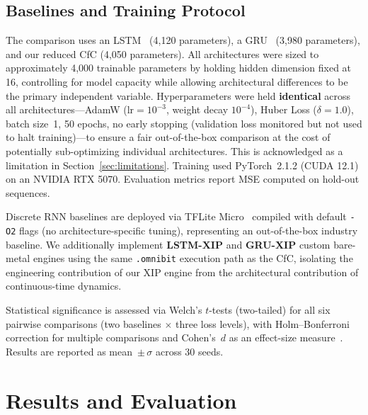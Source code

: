 \documentclass[conference]{IEEEtran}
\begin{document}
\subsection{Baselines and Training Protocol}
The comparison uses an LSTM~\cite{hochreiter1997lstm} (4,120 parameters), a
GRU~\cite{cho2014gru} (3,980 parameters), and our reduced CfC (4,050
parameters). All architectures were sized to approximately 4,000 trainable
parameters by holding hidden dimension fixed at 16, controlling for model
capacity while allowing architectural differences to be the primary
independent variable.
Hyperparameters were held \textbf{identical} across all architectures---AdamW
($\text{lr}=10^{-3}$, weight decay $10^{-4}$), Huber Loss ($\delta=1.0$),
batch size~1, 50 epochs, no early stopping (validation loss monitored but not
used to halt training)---to ensure a fair out-of-the-box comparison at the
cost of potentially sub-optimizing individual architectures. This is
acknowledged as a limitation in Section~\ref{sec:limitations}. Training used
PyTorch~2.1.2 (CUDA 12.1) on an NVIDIA RTX 5070. Evaluation metrics report
MSE computed on hold-out sequences.

Discrete RNN baselines are deployed via TFLite Micro~\cite{david2021tflitemicro}
compiled with default \texttt{-O2} flags (no architecture-specific tuning),
representing an out-of-the-box industry baseline. We additionally implement
\textbf{LSTM-XIP} and \textbf{GRU-XIP} custom bare-metal engines using the
same \texttt{.omnibit} execution path as the CfC, isolating the engineering
contribution of our XIP engine from the architectural contribution of
continuous-time dynamics.

Statistical significance is assessed via Welch's $t$-tests (two-tailed) for
all six pairwise comparisons (two baselines $\times$ three loss levels), with
Holm--Bonferroni correction for multiple comparisons and Cohen's~$d$ as an
effect-size measure~\cite{hochreiter1997lstm}. Results are reported as
mean~$\pm\,\sigma$ across 30 seeds.

\section{Results and Evaluation}
\end{document}
